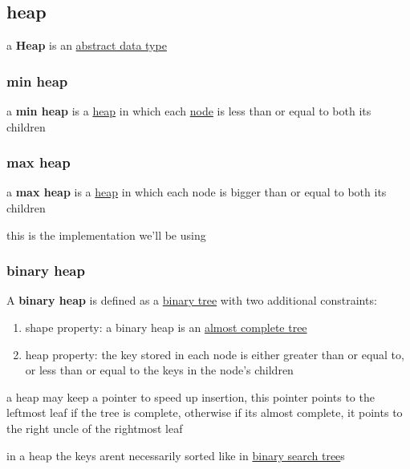 \documentclass[a4paper,12pt]{article}
\begin{document}
\subsection{heap}
\label{sec:org9903735}
\begin{definition}
a \textbf{Heap} is an \hyperref[sec:orga3b31cf]{abstract data type}\\[0pt]
\end{definition}
\subsubsection{min heap}
\label{sec:orgc87ebb0}
\begin{definition}
a \textbf{min heap} is a \hyperref[sec:org9903735]{heap} in which each \hyperref[sec:orgec4976f]{node} is less than or equal to both its children\\[0pt]
\end{definition}
\subsubsection{max heap}
\label{sec:org75e2e7b}
\begin{definition}
a \textbf{max heap} is a \hyperref[sec:org9903735]{heap} in which each node is bigger than or equal to both its children\\[0pt]
\end{definition}
this is the implementation we'll be using\\[0pt]
\subsubsection{binary heap}
\label{sec:orgff15739}
\begin{definition}
A \textbf{binary heap} is defined as a \hyperref[sec:org254f5f7]{binary tree} with two additional constraints:\\[0pt]
\begin{enumerate}
\item shape property: a binary heap is an \hyperref[sec:orgcd32ba8]{almost complete tree}\\[0pt]
\item heap property: the key stored in each node is either greater than or equal to, or less than or equal to the keys in the node's children\\[0pt]
\end{enumerate}

\begin{characteristic}
a heap may keep a pointer to speed up insertion, this pointer points to the leftmost leaf if the tree is complete, otherwise if its almost complete, it points to the right uncle of the rightmost leaf\\[0pt]
\end{characteristic}
\begin{note}
in a heap the keys arent necessarily sorted like in \hyperref[sec:orge1ff544]{binary search tree}s\\[0pt]
\end{note}
\end{definition}
\end{document}
